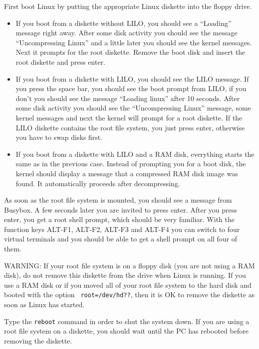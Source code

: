 \documentclass[12pt,a4paper]{article}
\begin{document}
First boot Linux by putting the appropriate Linux diskette into the
floppy drive.
\begin{itemize}
\item If you boot from a diskette without LILO, you should see a
  ``Loading'' message right away. After some disk activity you should
  see the message ``Uncompressing Linux'' and a little later you
  should see the kernel messages. Next it prompts for the root
  diskette. Remove the boot disk and insert the root diskette and press
  enter. 
\item If you boot from a diskette with LILO, you should see the LILO
  message. If you press the space bar, you should see the boot prompt
  from LILO, if you don't you should see the message ``Loading linux''
  after 10 seconds. After some disk activity you should see the
  ``Uncompressing Linux'' message, some kernel messages and next the
  kernel will prompt for a root diskette. If the LILO diskette
  contains the root file system, you just press enter, otherwise you
  have to swap disks first.
\item If you boot from a diskette with LILO and a RAM disk, everything
  starts the same as in the previous case. Instead of prompting you
  for a boot disk, the kernel should display a message that a
  compressed RAM disk image was found. It automatically proceeds after
  decompressing. 
\end{itemize}
As soon as the root file system is mounted, you should see a message
from Busybox. A few seconds later you are invited to press
enter. After you press enter, you get a root shell prompt, which
should be very familiar. With the function keys ALT-F1, ALT-F2, ALT-F3
and ALT-F4 you can switch to four virtual terminals and you should be
able to get a shell prompt on all four of them.

WARNING: If your root file system is on a floppy disk (you are not using a RAM
disk), do not remove this diskette from the drive when Linux is
running. If you use a RAM disk or if you moved all of your root file
system to the hard disk and booted with the option {\tt
  root=/dev/hd??}, then it is OK to remove the diskette as soon as
Linux has started.

Type the {\tt reboot} command in order to shut the system
down. If you are using a root file system on a diskette,
you should wait until the PC has rebooted before removing the
diskette.
\end{document}
